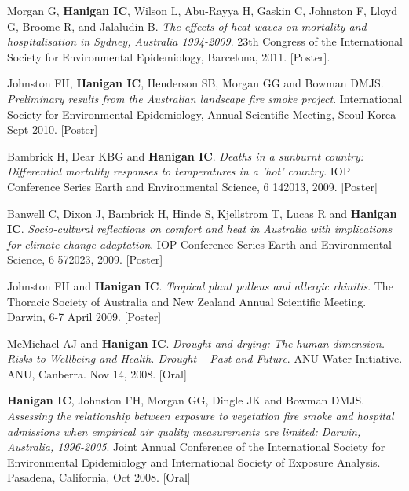 \documentclass[a4paper,11pt]{article}
\begin{document}
\begin{revnumerate}
\item Morgan G, \textbf{Hanigan IC}, Wilson L, Abu-Rayya H, Gaskin C, Johnston F, Lloyd G, Broome R, and Jalaludin B. \emph{The effects of heat waves on mortality and hospitalisation in Sydney, Australia 1994-2009}. 23th Congress of the International Society for Environmental Epidemiology, Barcelona, 2011. [Poster].

\item Johnston FH, \textbf{Hanigan IC}, Henderson SB, Morgan GG and Bowman DMJS. \emph{Preliminary results from the Australian landscape fire smoke project}. International Society for Environmental Epidemiology, Annual Scientific Meeting, Seoul Korea Sept 2010. [Poster]

\item Bambrick H, Dear KBG and \textbf{Hanigan IC}.  \emph{Deaths in a sunburnt country: Differential mortality responses to temperatures in a 'hot' country}. IOP Conference Series Earth and Environmental Science, 6 142013, 2009. [Poster]

\item Banwell C, Dixon J, Bambrick H, Hinde S, Kjellstrom T, Lucas R and \textbf{Hanigan IC}. \emph{Socio-cultural reflections on comfort and heat in Australia with implications for climate change adaptation}. IOP Conference Series Earth and Environmental Science, 6 572023, 2009. [Poster]

\item Johnston FH and \textbf{Hanigan IC}.  \emph{Tropical plant pollens and allergic rhinitis}.  The Thoracic Society of Australia and New Zealand Annual Scientific Meeting.  Darwin, 6-7 April 2009. [Poster]

\item McMichael AJ and \textbf{Hanigan IC}. \emph{Drought and drying: The human dimension. Risks to Wellbeing and Health. Drought – Past and Future}. ANU Water Initiative. ANU, Canberra. Nov 14, 2008. [Oral]

\item \textbf{Hanigan IC}, Johnston FH, Morgan GG, Dingle JK and Bowman DMJS. \emph{Assessing the relationship between exposure to vegetation fire smoke and hospital admissions when empirical air quality measurements are limited: Darwin, Australia, 1996-2005}. Joint Annual Conference of the International Society for Environmental Epidemiology and International Society of Exposure Analysis. Pasadena, California, Oct 2008. [Oral]


\end{revnumerate}
\end{document}
